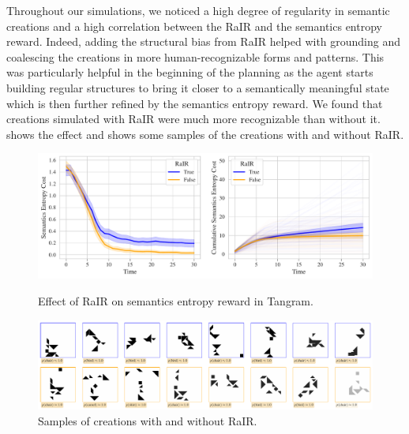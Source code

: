 Throughout our simulations, we noticed a high degree of regularity in semantic creations and a high correlation between the RaIR and the semantics entropy reward. 
Indeed, adding the structural bias from RaIR helped with grounding and coalescing the creations in more human-recognizable forms and patterns.
This was particularly helpful in the beginning of the planning as the agent starts building regular structures to bring it closer to a semantically meaningful state which is then further refined by the semantics entropy reward.
We found that creations simulated with RaIR were much more recognizable than without it.
 shows the effect and  shows some samples of the creations with and without RaIR.

\begin{figure}[H]
    \centering
    \includegraphics[width=\textwidth]{images/rair_comparison.pdf}
    \caption{Effect of RaIR on semantics entropy reward in Tangram.}
    \label{fig:rair}
    \vspace{12pt}
    \includegraphics[width=\textwidth]{images/rair_samples.pdf}
    \caption{Samples of creations with and without RaIR.}
    \label{fig:rair-samples}
\end{figure}


